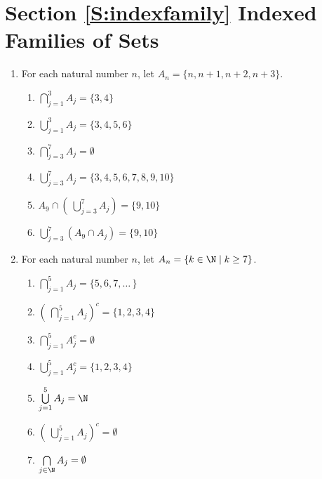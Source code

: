 \section*{Section \ref{S:indexfamily} Indexed Families of Sets}

\begin{enumerate}
\item For each natural number $n$, let $A_n = \{ n, n + 1, n + 2, n + 3 \}$.
\begin{multicols}{2}
\begin{enumerate}
\item $\bigcap\limits_{j=1}^{3}A_j = \{3, 4 \}$

\item $\bigcup\limits_{j=1}^{3}A_j = \{3, 4, 5, 6 \}$

\item $\bigcap\limits_{j=3}^{7}A_j = \emptyset$

\item $\bigcup\limits_{j=3}^{7}A_j = \{3, 4, 5, 6, 7, 8, 9, 10 \}$

\item $A_9 \cap \left(\:\bigcup\limits_{j=3}^{7}A_j \right) = \{9, 10 \}$

\item $\bigcup\limits_{j=3}^{7}\left( A_9 \cap A_j \right) = \{9, 10 \}$
\end{enumerate}
\end{multicols}


\item For each natural number $n$, let $A_n = \{ k \in \N \mid k \geq 7\}$.
\begin{multicols}{2}
\begin{enumerate}
\item $\bigcap\limits_{j=1}^{5}A_j = \{5, 6, 7, \ldots \, \}$

\item $\left(\: \bigcap\limits_{j=1}^{5}A_j \right)^c = \{1, 2, 3, 4 \}$

\item $\bigcap\limits_{j=1}^{5}A_j^c = \emptyset$

\item $\bigcup\limits_{j=1}^{5}A_j^c = \{1, 2, 3, 4 \}$

\item $\bigcup\limits_{j=1}^{5}A_j = \N$

\item $\left(\: \bigcup\limits_{j=1}^{5}A_j \right)^c = \emptyset$

\item $\bigcap\limits_{j \in \N}^{}A_j = \emptyset$


\end{enumerate}
\end{multicols}
\end{enumerate}
